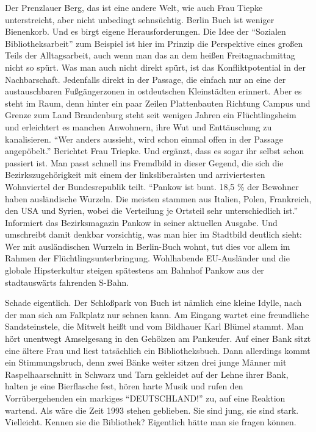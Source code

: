 \documentclass[a4paper,
fontsize=11pt,
oneside,
numbers=noperiodatend,
parskip=half-,
bibliography=totoc,
final
]{scrartcl}
\begin{document}
Der Prenzlauer Berg, das ist eine andere Welt, wie auch Frau Tiepke
unterstreicht, aber nicht unbedingt sehnsüchtig. Berlin Buch ist weniger
Bienenkorb. Und es birgt eigene Herausforderungen. Die Idee der
\enquote{Sozialen Bibliotheksarbeit} zum Beispiel ist hier im Prinzip
die Perspektive eines großen Teils der Alltagsarbeit, auch wenn man das
an dem heißen Freitagnachmittag nicht so spürt. Was man auch nicht
direkt spürt, ist das Konfliktpotential in der Nachbarschaft. Jedenfalls
direkt in der Passage, die einfach nur an eine der austauschbaren
Fußgängerzonen in ostdeutschen Kleinstädten erinnert. Aber es steht im
Raum, denn hinter ein paar Zeilen Plattenbauten Richtung Campus und
Grenze zum Land Brandenburg steht seit wenigen Jahren ein
Flüchtlingsheim und erleichtert es manchen Anwohnern, ihre Wut und
Enttäuschung zu kanalisieren. \enquote{Wer anders aussieht, wird schon
einmal offen in der Passage angepöbelt.} Berichtet Frau Triepke. Und
ergänzt, dass es sogar ihr selbst schon passiert ist. Man passt schnell
ins Fremdbild in dieser Gegend, die sich die Bezirkszugehörigkeit mit
einem der linksliberalsten und arriviertesten Wohnviertel der
Bundesrepublik teilt. \enquote{Pankow ist bunt. 18,5 \% der Bewohner
haben ausländische Wurzeln. Die meisten stammen aus Italien, Polen,
Frankreich, den USA und Syrien, wobei die Verteilung je Ortsteil sehr
unterschiedlich ist.} Informiert das Bezirksmagazin Pankow in seiner
aktuellen Ausgabe. Und umschreibt damit denkbar vorsichtig, was man hier
im Stadtbild deutlich sieht: Wer mit ausländischen Wurzeln in
Berlin-Buch wohnt, tut dies vor allem im Rahmen der
Flüchtlingsunterbringung. Wohlhabende EU-Ausländer und die globale
Hipsterkultur steigen spätestens am Bahnhof Pankow aus der stadtauswärts
fahrenden S-Bahn.

Schade eigentlich. Der Schloßpark von Buch ist nämlich eine kleine
Idylle, nach der man sich am Falkplatz nur sehnen kann. Am Eingang
wartet eine freundliche Sandsteinstele, die Mitwelt heißt und vom
Bildhauer Karl Blümel stammt. Man hört unentwegt Amselgesang in den
Gehölzen am Pankeufer. Auf einer Bank sitzt eine ältere Frau und liest
tatsächlich ein Bibliotheksbuch. Dann allerdings kommt ein
Stimmungsbruch, denn zwei Bänke weiter sitzen drei junge Männer mit
Raspelhaarschnitt in Schwarz und Tarn gekleidet auf der Lehne ihrer
Bank, halten je eine Bierflasche fest, hören harte Musik und rufen den
Vorrübergehenden ein markiges \enquote{DEUTSCHLAND!} zu, auf eine
Reaktion wartend. Als wäre die Zeit 1993 stehen geblieben. Sie sind
jung, sie sind stark. Vielleicht. Kennen sie die Bibliothek? Eigentlich
hätte man sie fragen können.
\end{document}
